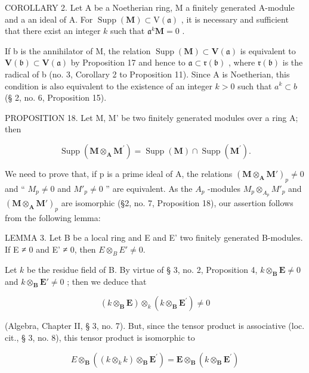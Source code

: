COROLLARY 2. Let A be a Noetherian ring, M a finitely generated A-module and a an ideal of A. For \(\operatorname{Supp}(\mathbf{M}) \subset \mathrm{V}(\mathfrak{a})\) , it is necessary and sufficient that there exist an integer \(k\) such that \(\mathfrak{a}^k\mathbf{M} = 0\) .

If b is the annihilator of M, the relation \(\operatorname{Supp}(\mathbf{M}) \subset \mathbf{V}(\mathfrak{a})\) is equivalent to \(\mathbf{V}(\mathfrak{b}) \subset \mathbf{V}(\mathfrak{a})\) by Proposition 17 and hence to \(\mathfrak{a} \subset \mathfrak{r}(\mathfrak{b})\) , where \(\mathfrak{r}(\mathfrak{b})\) is the radical of b (no. 3, Corollary 2 to Proposition 11). Since A is Noetherian, this condition is also equivalent to the existence of an integer \(k > 0\) such that \(a^{k} \subset b\) (§ 2, no. 6, Proposition 15).

PROPOSITION 18. Let M, M' be two finitely generated modules over a ring A; then

\[
\operatorname{Supp} (\mathbf {M} \otimes_ {\mathbf {A}} \mathbf {M} ^ {\prime}) = \operatorname{Supp} (\mathbf {M}) \cap \operatorname{Supp} (\mathbf {M} ^ {\prime}).\tag{10}
\]

We need to prove that, if p is a prime ideal of A, the relations \((\mathbf{M} \otimes_{\mathbf{A}} \mathbf{M}')_{p} \neq 0\) and `` \(M_{p} \neq 0\) and \(M'_{p} \neq 0\) '' are equivalent. As the \(A_{p}\) -modules \(M_{p} \otimes_{A_{p}} M'_{p}\) and \((\mathbf{M} \otimes_{\mathbf{A}} \mathbf{M}')_{p}\) are isomorphic (§2, no. 7, Proposition 18), our assertion follows from the following lemma:

LEMMA 3. Let B be a local ring and E and E' two finitely generated B-modules. If E ≠ 0 and E' ≠ 0, then \(E \otimes_{B} E' \neq 0\).

Let \(k\) be the residue field of B. By virtue of § 3, no. 2, Proposition 4, \(k \otimes_{\mathbf{B}} \mathbf{E} \neq 0\) and \(k \otimes_{\mathbf{B}} \mathbf{E}' \neq 0\) ; then we deduce that

\[
(k \otimes_ {\mathbf {B}} \mathbf {E}) \otimes_ {k} (k \otimes_ {\mathbf {B}} \mathbf {E} ^ {\prime}) \neq 0
\]

(Algebra, Chapter II, § 3, no. 7). But, since the tensor product is associative (loc. cit., § 3, no. 8), this tensor product is isomorphic to

\[
E \otimes_ {\mathbf {B}} ((k \otimes_ {k} k) \otimes_ {\mathbf {B}} \mathbf {E} ^ {\prime}) = \mathbf {E} \otimes_ {\mathbf {B}} (k \otimes_ {\mathbf {B}} \mathbf {E} ^ {\prime})
\]

